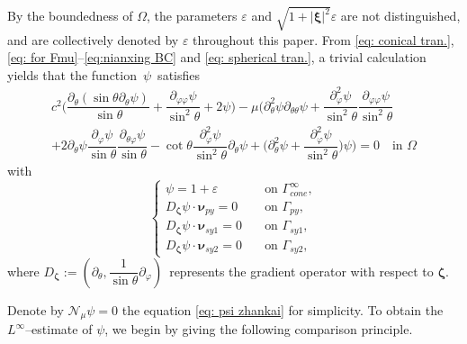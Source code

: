 \documentclass[reqno,12pt]{amsart}
\numberwithin{equation}{section}
\begin{document}
By the boundedness of $\Omega$, the parameters $\varepsilon$ and $\sqrt{1+|\bm{\xi}|^2} \varepsilon$ are not distinguished, and are collectively denoted by $\varepsilon$ throughout this paper. From \eqref{eq: conical tran.}, \eqref{eq: for Fmu}--\eqref{eq:nianxing BC} and \eqref{eq: spherical tran.}, a trivial calculation yields that the function~$\psi$~satisfies
\begin{multline}\label{eq: psi zhankai}
    c^{2}\big(\dfrac{\partial_{\theta}(\sin\theta\partial_{\theta}\psi)}{\sin\theta}+\dfrac{\partial_{\varphi\varphi} \psi}{\sin^2\theta}+2\psi\big)-\mu\Big(\partial^{2}_\theta\psi\partial_{\theta\theta}\psi+\dfrac{\partial^2_\varphi\psi}{\sin^2\theta}\dfrac{\partial_{\varphi\varphi} \psi}{\sin^2\theta}\\+2\partial_\theta \psi\dfrac{ \partial_\varphi\psi}{\sin\theta}\dfrac{\partial_{\theta\varphi}\psi}{\sin\theta}-\cot\theta\dfrac{\partial^2_\varphi\psi}{\sin^2\theta}\partial_\theta\psi+\big(\partial^{2}_\theta\psi+\dfrac{\partial^2_\varphi\psi}{\sin^2\theta}\big)\psi\Big)
    =0\quad\text{in $\Omega$}
\end{multline}
with 
  \begin{equation}\label{eq:nianxing BC4}
		\begin{cases}
	        \psi=1+\varepsilon \quad&\text{on $\Gamma_{cone}^{\infty}$},\\ 
			D_{\bm{\zeta}}\psi\cdot\bm{\nu}_{py}=0\quad&\text{on $\Gamma_{py}$},\\
			D_{\bm{\zeta}}\psi\cdot\bm{\nu}_{sy1}=0\quad&\text{on $\Gamma_{sy1}$},\\
                D_{\bm{\zeta}}\psi\cdot\bm{\nu}_{sy2}=0\quad&\text{on $\Gamma_{sy2}$},	
		\end{cases}
	\end{equation}
where $D_{\bm{\zeta}}:=(\partial_\theta, \dfrac{1}{\sin\theta}\partial_\varphi)$~represents the gradient operator with respect to $\bm{\zeta}$.     

Denote by $\mathcal{N}_\mu \psi=0$ the equation \eqref{eq: psi zhankai} for simplicity. To obtain the $L^\infty$--estimate of $\psi$, we begin by giving the following comparison principle.
\end{document}
